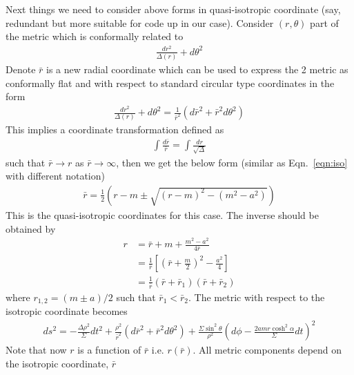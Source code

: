 \documentclass[prd]{revtex4}
\begin{document}
Next things we need to consider above forms in quasi-isotropic coordinate (say, redundant but more suitable for code up in our case).  Consider $(r,\theta)$ part of the metric which is conformally related to
\begin{align}
\frac{dr^2}{\Delta(r)} + d\theta^2
\end{align}
Denote $\bar{r}$ is a new radial coordinate which can be used to express the 2 metric as conformally flat and with respect to standard circular type coordinates in the form
\begin{align}
\frac{dr^2}{\Delta(r)} + d\theta^2 = \frac{1}{\bar{r}^2} (d \bar{r}^2 + \bar{r}^2 d \theta^2)
\end{align}
This implies a coordinate transformation defined as
\begin{align}
\int \frac{d \bar{r}}{\bar{r}} = \int \frac{dr}{\sqrt{\Delta}}
\end{align}
such that $\bar{r} \rightarrow r$ as $\bar{r} \rightarrow \infty$, then we get the below form (similar as Eqn.~\ref{eqn:iso} with different notation)
\begin{align}
\bar{r} = \frac{1}{2} ( r-m \pm \sqrt{(r-m)^2 - (m^2 - a^2)})
\end{align}
This is the quasi-isotropic coordinates for this case. The inverse should be obtained by
\begin{align}
r &= \bar{r} + m + \frac{m^2 - a^2}{4 \bar{r}} \nonumber \\
  &= \frac{1}{\bar{r}} \left[ \left(\bar{r} +\frac{m}{2} \right)^2 - \frac{a^2}{4} \right] \nonumber \\
  &= \frac{1}{\bar{r}} (\bar{r} + \bar{r}_1)(\bar{r} + \bar{r}_2)
\end{align}
where $r_{1,2} = (m \pm a)/2$ such that $\bar{r}_1 < \bar{r}_2$. The metric with respect to the isotropic coordinate becomes
\begin{align}
ds^2 = - \frac{\Delta \rho^2}{\Sigma} dt^2 + \frac{\rho^2}{\bar{r}^2} (d \bar{r}^2 + \bar{r}^2 d \theta^2) + \frac{\Sigma \sin^2 \theta}{\rho^2} \left(d \phi - \frac{2 a m r \cosh^2 \alpha}{\Sigma} dt \right)^2
\end{align}
Note that now $r$ is a function of $\bar{r}$ i.e. $r(\bar{r})$. All metric components depend on the isotropic coordinate, $\bar{r}$
\end{document}
